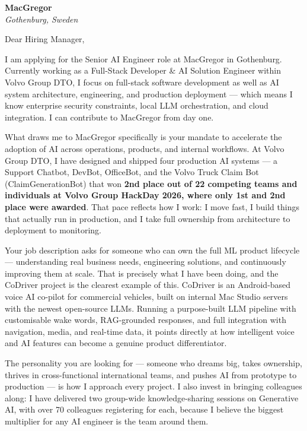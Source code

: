 \documentclass[a4paper,10pt]{article}
\begin{document}
\pagestyle{empty}

{\color{linkedinblue}\Large \textbf{MacGregor}}\\
{\color{linkedinblue}\textit{Gothenburg, Sweden}}

\vspace{15pt}

Dear Hiring Manager,

\vspace{8pt}

I am applying for the Senior AI Engineer role at MacGregor in Gothenburg. Currently working as a Full-Stack Developer \& AI Solution Engineer within Volvo Group DTO, I focus on full-stack software development as well as AI system architecture, engineering, and production deployment --- which means I know enterprise security constraints, local LLM orchestration, and cloud integration. I can contribute to MacGregor from day one.

What draws me to MacGregor specifically is your mandate to accelerate the adoption of AI across operations, products, and internal workflows. At Volvo Group DTO, I have designed and shipped four production AI systems --- a Support Chatbot, DevBot, OfficeBot, and the Volvo Truck Claim Bot (ClaimGenerationBot) that won \textbf{2nd place out of 22 competing teams and individuals at Volvo Group HackDay 2026, where only 1st and 2nd place were awarded}. That pace reflects how I work: I move fast, I build things that actually run in production, and I take full ownership from architecture to deployment to monitoring.

Your job description asks for someone who can own the full ML product lifecycle --- understanding real business needs, engineering solutions, and continuously improving them at scale. That is precisely what I have been doing, and the CoDriver project is the clearest example of this. CoDriver is an Android-based voice AI co-pilot for commercial vehicles, built on internal Mac Studio servers with the newest open-source LLMs. Running a purpose-built LLM pipeline with customisable wake words, RAG-grounded responses, and full integration with navigation, media, and real-time data, it points directly at how intelligent voice and AI features can become a genuine product differentiator.

The personality you are looking for --- someone who dreams big, takes ownership, thrives in cross-functional international teams, and pushes AI from prototype to production --- is how I approach every project. I also invest in bringing colleagues along: I have delivered two group-wide knowledge-sharing sessions on Generative AI, with over 70 colleagues registering for each, because I believe the biggest multiplier for any AI engineer is the team around them.
\end{document}
